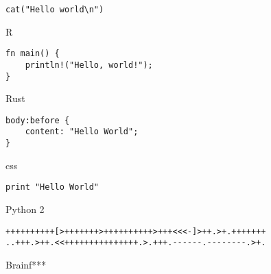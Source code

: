 \documentclass{article}
\begin{document}
\begin{multicols}{2}


\begin{verbatim}
cat("Hello world\n")
\end{verbatim}

\columnbreak

\begin{flushright}
R
\end{flushright}

\end{multicols}


\hrulefill
\begin{multicols}{2}


\begin{verbatim}
fn main() {
    println!("Hello, world!");
}
\end{verbatim}

\columnbreak

\begin{flushright}
Rust
\end{flushright}

\end{multicols}

\hrulefill
\begin{multicols}{2}


\begin{verbatim}
body:before {
    content: "Hello World";
}
\end{verbatim}

\columnbreak

\begin{flushright}
css
\end{flushright}

\end{multicols}

\hrulefill
\begin{multicols}{2}


\begin{verbatim}
print "Hello World"
\end{verbatim}

\columnbreak

\begin{flushright}
Python 2
\end{flushright}

\end{multicols}

\hrulefill
\begin{multicols}{2}


\begin{verbatim}
++++++++++[>+++++++>++++++++++>+++<<<-]>++.>+.+++++++
..+++.>++.<<+++++++++++++++.>.+++.------.--------.>+.
\end{verbatim}

\columnbreak

\begin{flushright}
Brainf***
\end{flushright}

\end{multicols}
\end{document}
